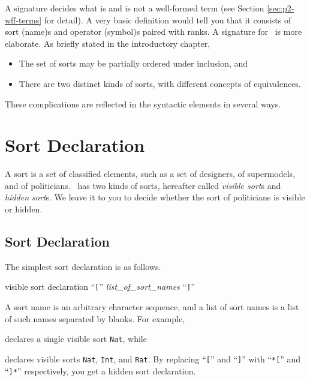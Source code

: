 \documentclass[a4paper]{memoir}
\begin{document}
A signature
decides what is and is not a well-formed term (see
Section \ref{sec:p2-wff-terms} for detail). A
very basic definition would tell you that it consists of sort
(name)s and operator (symbol)s paired with ranks.
A signature for \cafeobj~is more elaborate. As briefly stated
in the introductory chapter,
\begin{itemize}
\item The set of sorts may be partially ordered under inclusion, and
\item There are two distinct kinds of sorts, with different concepts of
  equivalences.
\end{itemize}
These complications are reflected in the syntactic elements
in several ways.

\section{Sort Declaration}\label{sec:p2-sort-declaration}

A sort is a set of classified elements, such as
a set of designers, of supermodels, and of politicians.
\cafeobj~has two kinds of sorts, hereafter called {\em visible sort\/}s
and {\em hidden sort\/}s.
We leave it to you to decide whether the sort of politicians
is visible or hidden.

\subsection{Sort Declaration}\label{sec:p2-sort-decl-syntax}

The simplest sort declaration is as follows.

\begin{bsyntax} visible sort declaration
``\texttt{[}'' \textit{list\_of\_sort\_names} ``\texttt{]}''
\end{bsyntax}

A sort name is an arbitrary character sequence, and a list of sort names
is a list of such names separated by blanks. For example,
\begin{vvtm}
\begin{ccode}
  [ Nat ]
\end{ccode}
\end{vvtm}
declares a single visible sort \texttt{Nat}, while
\begin{vvtm}
\begin{ccode}
\end{ccode}
\end{vvtm}
declares visible sorts \texttt{Nat}, \texttt{Int}, and \texttt{Rat}.
By replacing ``\verb|[|'' and ``\verb|]|'' with ``\verb|*[|'' and
``\verb|]*|'' respectively, you get a hidden sort declaration.
\end{document}
